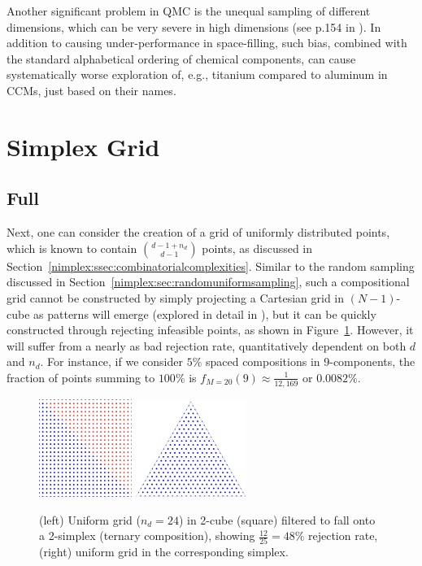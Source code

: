 Another significant problem in QMC is the unequal sampling of different dimensions, which can be very severe in high dimensions (see p.154 in \cite{Lemieux2009MonteSampling}). In addition to causing under-performance in space-filling, such bias, combined with the standard alphabetical ordering of chemical components, can cause systematically worse exploration of, e.g., titanium compared to aluminum in CCMs, just based on their names.


\section{Simplex Grid} \label{nimplex:sec:simplexgrid}

\subsection{Full} \label{nimplex:ssec:fullgrid}

Next, one can consider the creation of a grid of uniformly distributed points, which is known to contain $\binom{d-1+n_d}{d-1}$ points, as discussed in Section~\ref{nimplex:ssec:combinatorialcomplexities}. Similar to the random sampling discussed in Section~\ref{nimplex:sec:randomuniformsampling}, such a compositional grid cannot be constructed by simply projecting a Cartesian grid in $(N-1)$-cube as patterns will emerge (explored in detail in \cite{Otis2017AnSystems}), but it can be quickly constructed through rejecting infeasible points, as shown in Figure~\ref{nimplex:fig:simplexgrid}. However, it will suffer from a nearly as bad rejection rate, quantitatively dependent on both $d$ and $n_d$. For instance, if we consider $5\%$ spaced compositions in 9-components, the fraction of points summing to $100\%$ is $f_{M=20}(9) \approx \frac{1}{12,169}$ or $0.0082\%$. 

\begin{figure}[h]
    \centering
    \includegraphics[width=0.270\textwidth]{nimplex/2A.png}
    \hspace{48pt}
    \includegraphics[width=0.320\textwidth]{nimplex/2B.png}
    \caption{(left) Uniform grid ($n_d=24$) in 2-cube (square) filtered to fall onto a 2-simplex (ternary composition), showing $\frac{12}{25}=48\%$ rejection rate, (right) uniform grid in the corresponding simplex.} 
    \label{nimplex:fig:simplexgrid}
\end{figure}

